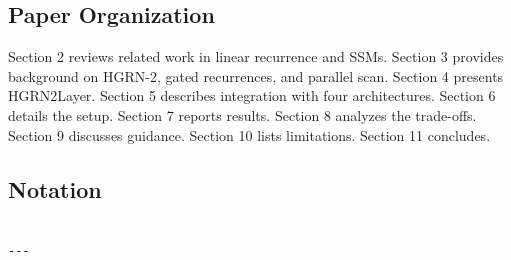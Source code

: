 \subsection{Paper Organization}

Section 2 reviews related work in linear recurrence and SSMs. Section 3 
provides background on HGRN-2, gated recurrences, and parallel scan. 
Section 4 presents HGRN2Layer. Section 5 describes integration with four 
architectures. Section 6 details the setup. Section 7 reports results. 
Section 8 analyzes the trade-offs. Section 9 discusses guidance. Section 10 
lists limitations. Section 11 concludes.



\subsection{Notation}

\begin{lstlisting}

---
\end{lstlisting}
